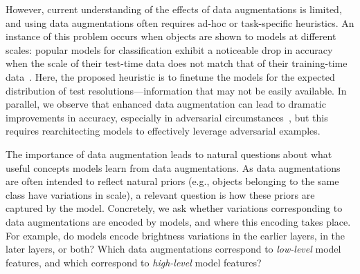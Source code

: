 However, current understanding of the effects of data augmentations is limited, and using data augmentations often requires ad-hoc or task-specific heuristics.
An instance of this problem occurs when objects are shown to models at different scales: popular models for classification exhibit a noticeable drop in accuracy when the scale of their test-time data does not match that of their training-time data~\cite{NIPS2019_9035}.
Here, the proposed heuristic is to finetune the models for the expected distribution of test resolutions---information that may not be easily available.
In parallel, we observe that enhanced data augmentation can lead to dramatic improvements in accuracy, especially in adversarial circumstances~\cite{xie2019adversarial}, but this requires rearchitecting models to effectively leverage adversarial examples.
 

The importance of data augmentation leads to natural questions about what useful concepts models learn from data augmentations.
As data augmentations are often intended to reflect natural priors (e.g., objects belonging to the same class have variations in scale), a relevant question is how these priors are captured by the model.
Concretely, we ask whether variations corresponding to data augmentations are encoded by models, and where this encoding takes place.
For example, do models encode brightness variations in the earlier layers, in the later layers, or both? 
Which data augmentations correspond to \emph{low-level} model features, and which correspond to \emph{high-level} model features?


